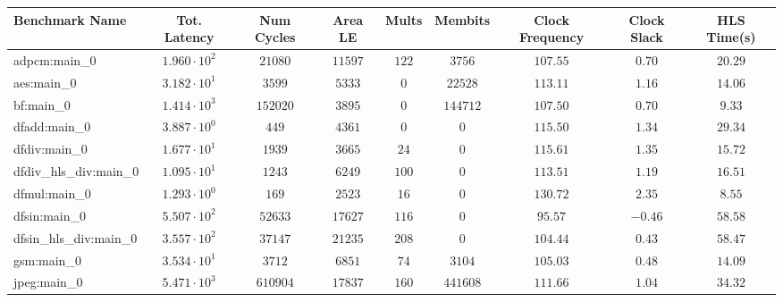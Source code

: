 \begin{tabular}{|l|c|c|c|c|c|c|c|c|}
\hline
Benchmark Name          & Tot. Latency           & Num Cycles  & Area LE    & Mults   & Membits    & Clock Frequency & Clock Slack & HLS Time(s) \\
\hline
adpcm:main\_0           & $ 1.960 \cdot 10^{2} $ & $ 21080   $ & $ 11597  $ & $ 122 $ & $ 3756   $ & $ 107.55      $ & $ 0.70    $ & $ 20.29   $ \\
aes:main\_0             & $ 3.182 \cdot 10^{1} $ & $ 3599    $ & $ 5333   $ & $ 0   $ & $ 22528  $ & $ 113.11      $ & $ 1.16    $ & $ 14.06   $ \\
bf:main\_0              & $ 1.414 \cdot 10^{3} $ & $ 152020  $ & $ 3895   $ & $ 0   $ & $ 144712 $ & $ 107.50      $ & $ 0.70    $ & $ 9.33    $ \\
dfadd:main\_0           & $ 3.887 \cdot 10^{0} $ & $ 449     $ & $ 4361   $ & $ 0   $ & $ 0      $ & $ 115.50      $ & $ 1.34    $ & $ 29.34   $ \\
dfdiv:main\_0           & $ 1.677 \cdot 10^{1} $ & $ 1939    $ & $ 3665   $ & $ 24  $ & $ 0      $ & $ 115.61      $ & $ 1.35    $ & $ 15.72   $ \\
dfdiv\_hls\_div:main\_0 & $ 1.095 \cdot 10^{1} $ & $ 1243    $ & $ 6249   $ & $ 100 $ & $ 0      $ & $ 113.51      $ & $ 1.19    $ & $ 16.51   $ \\
dfmul:main\_0           & $ 1.293 \cdot 10^{0} $ & $ 169     $ & $ 2523   $ & $ 16  $ & $ 0      $ & $ 130.72      $ & $ 2.35    $ & $ 8.55    $ \\
dfsin:main\_0           & $ 5.507 \cdot 10^{2} $ & $ 52633   $ & $ 17627  $ & $ 116 $ & $ 0      $ & $ 95.57       $ & $ -0.46   $ & $ 58.58   $ \\
dfsin\_hls\_div:main\_0 & $ 3.557 \cdot 10^{2} $ & $ 37147   $ & $ 21235  $ & $ 208 $ & $ 0      $ & $ 104.44      $ & $ 0.43    $ & $ 58.47   $ \\
gsm:main\_0             & $ 3.534 \cdot 10^{1} $ & $ 3712    $ & $ 6851   $ & $ 74  $ & $ 3104   $ & $ 105.03      $ & $ 0.48    $ & $ 14.09   $ \\
jpeg:main\_0            & $ 5.471 \cdot 10^{3} $ & $ 610904  $ & $ 17837  $ & $ 160 $ & $ 441608 $ & $ 111.66      $ & $ 1.04    $ & $ 34.32   $ \\

\end{tabular}
